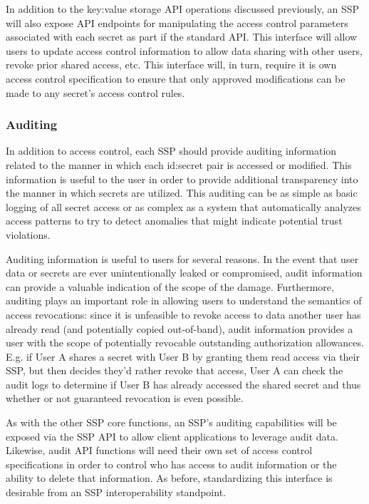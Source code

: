 In addition to the key:value storage API operations discussed
previously, an SSP will also expose API endpoints for manipulating the
access control parameters associated with each secret as part if the
standard API. This interface will allow users to update access control
information to allow data sharing with other users, revoke prior
shared access, etc. This interface will, in turn, require it is own
access control specification to ensure that only approved
modifications can be made to any secret's access control rules.

\subsubsection{Auditing}

In addition to access control, each SSP should provide auditing
information related to the manner in which each id:secret pair is
accessed or modified. This information is useful to the user in order
to provide additional transparency into the manner in which secrets
are utilized. This auditing can be as simple as basic logging of all
secret access or as complex as a system that automatically analyzes
access patterns to try to detect anomalies that might indicate
potential trust violations.

Auditing information is useful to users for several reasons. In the
event that user data or secrets are ever unintentionally leaked or
compromised, audit information can provide a valuable indication of
the scope of the damage. Furthermore, auditing plays an important role
in allowing users to understand the semantics of access revocations:
since it is unfeasible to revoke access to data another user has
already read (and potentially copied out-of-band), audit information
provides a user with the scope of potentially revocable outstanding
authorization allowances. E.g. if User A shares a secret with User B
by granting them read access via their SSP, but then decides they'd
rather revoke that access, User A can check the audit logs to
determine if User B has already accessed the shared secret and thus
whether or not guaranteed revocation is even possible.

As with the other SSP core functions, an SSP's auditing capabilities
will be exposed via the SSP API to allow client applications to
leverage audit data. Likewise, audit API functions will need their own
set of access control specifications in order to control who has
access to audit information or the ability to delete that
information. As before, standardizing this interface is desirable from
an SSP interoperability standpoint.

